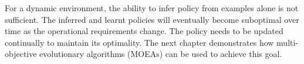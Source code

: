 For a dynamic environment, the ability to infer policy from examples
alone is not sufficient. The inferred and learnt policies will
eventually become suboptimal over time as the operational requirements
change. The policy needs to be updated continually to maintain its
optimality. The next chapter demonstrates how multi-objective
evolutionary algorithms (MOEAs) can be used to achieve this goal.
